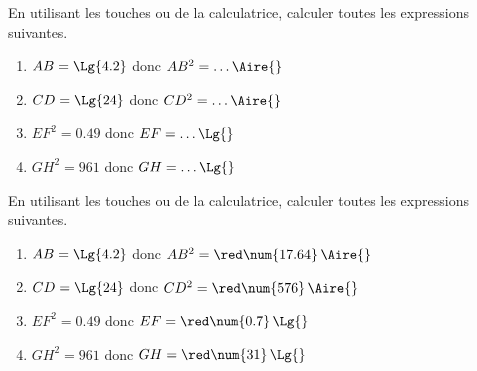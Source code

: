 \begin{exercice*}
    En utilisant les touches  ou \Calculatrice{//$\sqrt{\phantom{rrr}}$} de la calculatrice, calculer toutes les expressions suivantes.
    \begin{enumerate}
        \item $AB=\Lg{4.2}$ donc $AB^2=\ldots\Aire{}$
        \item $CD=\Lg{24}$ donc $CD^2=\ldots\Aire{}$
        \item $EF^2=\num{0.49}$ donc $EF=\ldots\Lg{}$
        \item $GH^2=961$ donc $GH=\ldots\Lg{}$
    \end{enumerate}    
\end{exercice*}
\begin{corrige}
    En utilisant les touches  ou \Calculatrice{//$\sqrt{\phantom{rrr}}$} de la calculatrice, calculer toutes les expressions suivantes.
    
    \begin{enumerate}
        \item $AB=\Lg{4.2}$ donc $AB^2={\red \num{17.64}}\,\Aire{}$
        \item $CD=\Lg{24}$ donc $CD^2={\red\num{576}}\,\Aire{}$
        \item $EF^2=\num{0.49}$ donc $EF={\red\num{0.7}}\,\Lg{}$
        \item $GH^2=961$ donc $GH={\red\num{31}}\,\Lg{}$
    \end{enumerate}  
\end{corrige}

